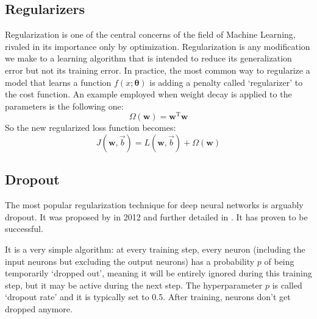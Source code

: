 \subsection{Regularizers}
Regularization is one of the central concerns of the field of Machine Learning, rivaled in its importance only by optimization. Regularization is any modification we make to a learning algorithm that is intended to reduce its generalization error but not its training error\footnotemark. In practice, the most common way to regularize a model that learns a function $f(x;\bm{\theta})$ is adding a penalty called `regularizer' to the cost function. An example employed when weight decay is applied to the parameters is the following one:
\begin{equation}
    \Omega(\mathbf{w}) = \mathbf{w}^\mathrm{T} \mathbf{w}
\end{equation}
So the new regularized loss function becomes:
\begin{equation}
	J(\mathbf{w},\vec{b}) = L(\mathbf{w},\vec{b}) + \Omega(\mathbf{w})
\end{equation}



\subsection{Dropout}
The most popular regularization technique for deep neural networks is arguably dropout. It was proposed by \cite{hinton} in 2012 and further detailed in \cite{srivastava}. It has proven to be successful.

It is a very simple algorithm: at every training step, every neuron (including the input neurons but excluding the output neurons) has a probability $p$ of being temporarily `dropped out', meaning it will be entirely ignored during this training step, but it may be active during the next step. The hyperparameter $p$ is called `dropout rate' and it is typically set to 0.5. After training, neurons don't get dropped anymore.

\begin{figure}[H]
	\centering
	
	\label{fig:DROPOUT}
\end{figure}

